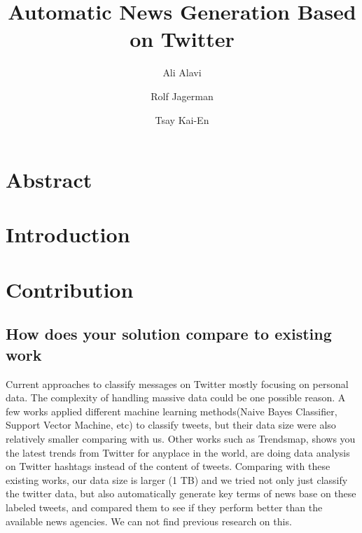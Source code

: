 \documentclass{llncs}
\begin{document}
%
\mainmatter              %
\pagestyle{headings}

%
\title{Automatic News Generation Based on Twitter}
%
%
\author{Ali Alavi \and Rolf Jagerman \and
Tsay Kai-En}
%
%
%

\maketitle              %
%

\section{Abstract}

\section{Introduction}

\section{Contribution}

\subsection{How does your solution compare to existing work}

Current approaches to classify messages on Twitter mostly focusing on personal data. The complexity of handling massive data could be one possible reason. A few works\cite{Go_Bhayani_Huang_2009}\cite{twitter-classifier} applied different machine learning methods(Naive Bayes Classifier, Support Vector Machine, etc) to classify tweets, but their data size were also relatively smaller comparing with us. Other works such as Trendsmap\cite{Trendmap}, shows you the latest trends from Twitter for anyplace in the world, are doing data analysis on Twitter hashtags instead of the content of tweets. Comparing with these existing works, our data size is larger (1 TB) and we tried not only just classify the twitter data, but also automatically generate key terms of news base on these labeled tweets, and compared them to see if they perform better than the available news agencies. We can not find previous research on this.
\end{document}
